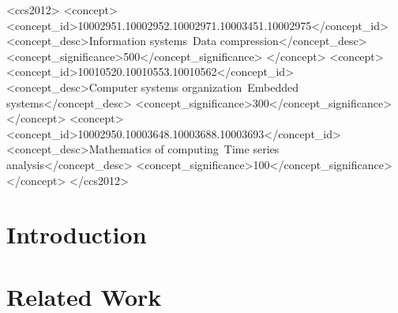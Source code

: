 \documentclass[acmlarge]{acmart}
\begin{document}

\begin{CCSXML}
<ccs2012>
 <concept>
  <concept_id>10002951.10002952.10002971.10003451.10002975</concept_id>
  <concept_desc>Information systems~Data compression</concept_desc>
  <concept_significance>500</concept_significance>
 </concept>
 <concept>
  <concept_id>10010520.10010553.10010562</concept_id>
  <concept_desc>Computer systems organization~Embedded systems</concept_desc>
  <concept_significance>300</concept_significance>
 </concept>
 <concept>
  <concept_id>10002950.10003648.10003688.10003693</concept_id>
  <concept_desc>Mathematics of computing~Time series analysis</concept_desc>
  <concept_significance>100</concept_significance>
 </concept>
</ccs2012>
\end{CCSXML}



\maketitle

\section{Introduction} \label{sec:intro}




% 

\vspace{3mm}
\section{Related Work} \label{sec:relatedWork}
\end{document}
